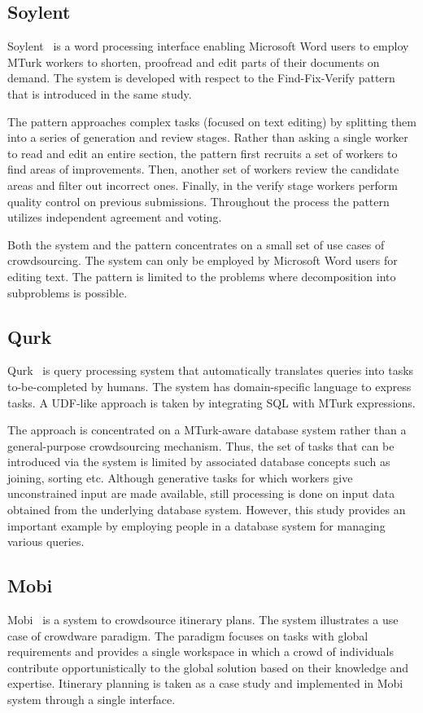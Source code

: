 \subsection{Soylent}
Soylent~\cite{Bernstein2010} is a word processing interface enabling Microsoft Word 
users to employ MTurk workers to shorten, proofread and edit parts of their 
documents on demand. The system is developed with respect to the 
Find-Fix-Verify pattern that is introduced in the same study.

The pattern approaches complex tasks (focused on text editing) by splitting them 
into a series of generation and review stages. Rather than asking a single worker 
to read and edit an entire section, the pattern first recruits a set of workers to 
find areas of improvements. Then, another set of workers review the candidate 
areas and filter out incorrect ones. Finally, in the verify stage workers perform 
quality control on previous submissions. Throughout the process the pattern 
utilizes independent agreement and voting.

Both the system and the pattern concentrates on a small set of use cases of 
crowdsourcing. The system can only be employed by Microsoft Word users 
for editing text. The pattern is limited to the problems where decomposition 
into subproblems is possible.

\subsection{Qurk}
Qurk~\cite{Marcus2011, Marcus2011b} is query processing system that 
automatically translates queries into tasks to-be-completed by humans. The system 
has domain-specific language to express tasks. A UDF-like approach is taken 
by integrating SQL with MTurk expressions.

The approach is concentrated on a MTurk-aware database system rather than 
a general-purpose crowdsourcing mechanism. Thus, the set of tasks that can be 
introduced via the system is limited by associated database concepts such as 
joining, sorting etc. Although generative tasks for which workers give unconstrained 
input are made available, still processing is done on input data obtained from the 
underlying database system. However, this study provides an important example 
by employing people in a database system for managing various queries.

\subsection{Mobi}
Mobi~\cite{Zhang2012} is a system to crowdsource itinerary plans. The system 
illustrates a use case of crowdware paradigm. The paradigm focuses on tasks 
with global requirements and provides a single workspace in which a crowd of 
individuals contribute opportunistically to the global solution based on their knowledge 
and expertise. Itinerary planning is taken as a case study and implemented 
in Mobi system through a single interface.

